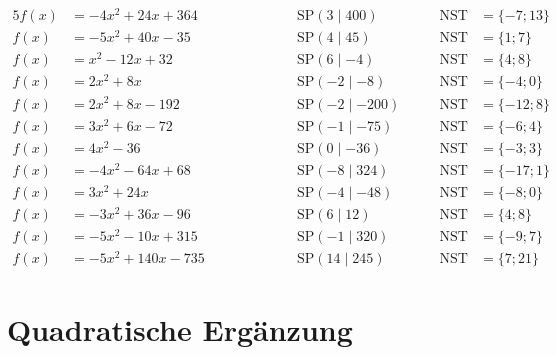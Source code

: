 \documentclass
[
  draft    = true,
  fontsize = 11pt,
  parskip  = half-,
  BCOR     = 0pt,
  DIV      = 11
]
{scrartcl}
\begin{document}
\begin{alignat*}{5}
  f(x)&=-4x^{2}+24x+364 \qquad&\qquad \quad&\text{SP}(3\mid400) \quad&\quad \text{NST}&=\{-7;13\} \\[0.5ex]
  f(x)&=-5x^{2}+40x-35 \qquad&\qquad \quad&\text{SP}(4\mid45) \quad&\quad \text{NST}&=\{1;7\} \\[0.5ex]
  f(x)&=x^{2}-12x+32 \qquad&\qquad \quad&\text{SP}(6\mid-4) \quad&\quad \text{NST}&=\{4;8\} \\[0.5ex]
  f(x)&=2x^{2}+8x \qquad&\qquad \quad&\text{SP}(-2\mid-8) \quad&\quad \text{NST}&=\{-4;0\} \\[0.5ex]
  f(x)&=2x^{2}+8x-192 \qquad&\qquad \quad&\text{SP}(-2\mid-200) \quad&\quad \text{NST}&=\{-12;8\} \\[0.5ex]
  f(x)&=3x^{2}+6x-72 \qquad&\qquad \quad&\text{SP}(-1\mid-75) \quad&\quad \text{NST}&=\{-6;4\} \\[0.5ex]
  f(x)&=4x^{2}-36 \qquad&\qquad \quad&\text{SP}(0\mid-36) \quad&\quad \text{NST}&=\{-3;3\} \\[0.5ex]
  f(x)&=-4x^{2}-64x+68 \qquad&\qquad \quad&\text{SP}(-8\mid324) \quad&\quad \text{NST}&=\{-17;1\} \\[0.5ex]
  f(x)&=3x^{2}+24x \qquad&\qquad \quad&\text{SP}(-4\mid-48) \quad&\quad \text{NST}&=\{-8;0\} \\[0.5ex]
  f(x)&=-3x^{2}+36x-96 \qquad&\qquad \quad&\text{SP}(6\mid12) \quad&\quad \text{NST}&=\{4;8\} \\[0.5ex]
  f(x)&=-5x^{2}-10x+315 \qquad&\qquad \quad&\text{SP}(-1\mid320) \quad&\quad \text{NST}&=\{-9;7\} \\[0.5ex]
  f(x)&=-5x^{2}+140x-735 \qquad&\qquad \quad&\text{SP}(14\mid245) \quad&\quad \text{NST}&=\{7;21\}
\end{alignat*}

\clearpage
\section*{Quadratische Ergänzung}
\end{document}
